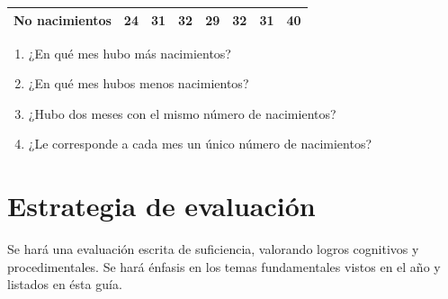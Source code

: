 \documentclass[letterpaper,11pt,twoside]{article}
\begin{document}
\begin{enumerate}
\begin{center}
\begin{tabular}{|c|c|c|c|c|c|c|c|}
\hline 
No nacimientos & 24 & 31 & 32 & 29 & 32 & 31 & 40 \\ 
\hline 
\end{tabular} 
\end{center}
\begin{enumerate}
\item ¿En qué mes hubo más nacimientos?
\item ¿En qué mes hubos menos nacimientos?
\item ¿Hubo dos meses con el mismo número de nacimientos?
\item ¿Le corresponde a cada mes un único número de nacimientos?
\end{enumerate}
\end{enumerate}
\section*{Estrategia de evaluación}
Se hará una evaluación escrita de suficiencia, valorando logros cognitivos y procedimentales. Se hará énfasis en los temas fundamentales vistos en el año y listados en ésta guía.
\end{document}
